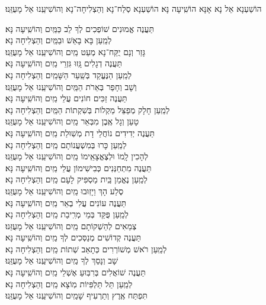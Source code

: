 \documentclass[twoside, openany, parskip=half, 11pt]{book}
\begin{document}
\begin{large}הוֹשַׁעְנָא אֵל נָא אָנָּא הוֹשִֽׁיעָה נָּא׃ הוֹשַׁעְנָא סְלַח־נָא וְהַצְלִיחָה־נָא וְהוֹשִׁיעֵֽנוּ אֵל מָעֻזֵּֽנוּ׃\end{large}

\begin{small}
	תַּעֲנֶה אֱמוּנִים שׁוֹפְכִים לְךָ לֵב כַּמַּֽיִם \hfill וְהוֹשִֽׁיעָה נָּא׃\\
	לְמַֽעַן בָּא בָאֵשׁ וּבַמַּֽיִם \hfill וְהַצְלִיחָה נָא׃ \\
	גָּזַר וְנָם יֻקַּח־נָא מְעַט מַֽיִם \hfill וְהוֹשִׁיעֵֽנוּ אֵל מָעֻזֵּֽנוּ׃\\
	תַּעֲנֶה דְגָלִים גָּֽזוּ גִּזְרֵי מַֽיִם \hfill וְהוֹשִֽׁיעָה נָּא׃\\
	לְמַֽעַן הַנֶּעֱקַד בְּשַֽׁעַר הַשָּׁמַֽיִם \hfill וְהַצְלִיחָה נָא׃\\
	וְשָׁב וְחָפַר בְּאֵרֹת הַמַּֽיִם \hfill וְהוֹשִׁיעֵֽנוּ אֵל מָעֻזֵּֽנוּ׃\\
	תַּעֲנֶה זַכִּים חוֹנִים עֲלֵי מַֽיִם \hfill וְהוֹשִֽׁיעָה נָּא׃\\
	לְמַֽעַן חָלָק מְפַצֵּל מַקְלוֹת בְּשִׁקְתוֹת הַמַּֽיִם \hfill וְהַצְלִיחָה נָא׃\\
	טָעַן וְגָל אֶֽבֶן מִבְּאֵר מַֽיִם \hfill וְהוֹשִׁיעֵֽנוּ אֵל מָעֻזֵּֽנוּ׃\\
	תַּעֲנֶה יְדִידִים נוֹחֲלֵי דָת מְשֽׁוּלַת מַֽיִם \hfill וְהוֹשִֽׁיעָה נָּא׃ \\
	לְמַֽעַן כָּרוּ בְּמִשְׁעֲנוֹתָם מַֽיִם \hfill וְהַצְלִיחָה נָא׃\\
	לְהָכִין לָֽמוֹ וּלְצֶאֱצָאֵֽימוֹ מַֽיִם \hfill וְהוֹשִׁיעֵֽנוּ אֵל מָעֻזֵּֽנוּ׃\\
	תַּעֲנֶה מִתְחַנְּנִים כְּבִישִׁימוֹן עֲלֵי מַֽיִם \hfill וְהוֹשִֽׁיעָה נָּא׃\\
	לְמַֽעַן נֶאֱמַן בַּֽיִת מַסְפִּיק לָעָם מַֽיִם \hfill וְהַצְלִיחָה נָא׃\\
	סֶלַע הָךְ וַיָזֽוּבוּ מַֽיִם \hfill וְהוֹשִׁיעֵֽנוּ אֵל מָעֻזֵּֽנוּ׃ \\
	תַּעֲנֶה עוֹנִים עֲלִי בְאֵר מַֽיִם \hfill וְהוֹשִֽׁיעָה נָּא׃ \\
	לְמַֽעַן פֻּקַּד בְּמֵי מְרִֽיבַת מַֽיִם \hfill וְהַצְלִיחָה נָא׃\\
	צְמֵאִים לְהַשְׁקוֹתָם מַֽיִם \hfill וְהוֹשִׁיעֵֽנוּ אֵל מָעֻזֵּנוּ׃ \\
	תַּעֲנֶה קְדוֹשִׁים מְנַסְּכִים לְךָ מַֽיִם \hfill וְהוֹשִֽׁיעָה נָּא׃ \\
	לְמַֽעַן רֹאשׁ מְשׁוֹרְרִים כְּתָאַב שְׁתוֹת מַֽיִם \hfill וְהַצְלִיחָה נָא׃\\
	שָׁב וְנָסַךְ לְךָ מַֽיִם \hfill וְהוֹשִׁיעֵֽנוּ אֵל מָעֻזֵּֽנוּ׃\\
	תַּעֲנֶה שׁוֹאֲלִים בְּרִבּֽוּעַ אֶשְׁלֵי מַֽיִם \hfill וְהוֹשִֽׁיעָה נָּא׃ \\
	לְמַֽעַן תֵּל תַּלְפִּיוֹת מֽוֹצָא מַֽיִם \hfill וְהַצְלִיחָה נָא׃\\
	תִּפְתַּח אֶֽרֶץ וְתַרְעִיף שָׁמַֽיִם \hfill וְהוֹשִׁיעֵֽנוּ אֵל מָעֻזֵּֽנוּ׃
	
\end{small}
\end{document}
